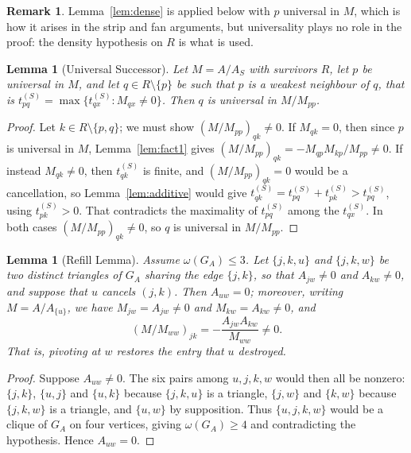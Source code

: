 \documentclass[11pt]{article}
\theoremstyle{plain}
\newtheorem{lemma}[theorem]{Lemma}
\theoremstyle{definition}
\newtheorem{remark}[theorem]{Remark}
\begin{document}
\begin{aiblock}
\begin{remark}\label{rem:dense-universal}
Lemma~\ref{lem:dense} is applied below with $p$ universal in $M$, which is how it arises in the strip
and fan arguments, but universality plays no role in the proof: the density hypothesis on $R$ is
what is used.
\end{remark}

\begin{lemma}[Universal Successor]\label{lem:univsucc}
Let $M=A/A_S$ with survivors $R$, let $p$ be universal in $M$, and let $q\in R\setminus\{p\}$ be such
that $p$ is a weakest neighbour of $q$, that is
$t^{(S)}_{pq}=\max\{t^{(S)}_{qx}:M_{qx}\neq0\}$. Then $q$ is universal in $M/M_{pp}$.
\end{lemma}

\begin{proof}
Let $k\in R\setminus\{p,q\}$; we must show $(M/M_{pp})_{qk}\neq0$. If $M_{qk}=0$, then since $p$ is
universal in $M$, Lemma~\ref{lem:fact1} gives $(M/M_{pp})_{qk}=-M_{qp}M_{kp}/M_{pp}\neq0$. If instead
$M_{qk}\neq0$, then $t^{(S)}_{qk}$ is finite, and $(M/M_{pp})_{qk}=0$ would be a cancellation, so
Lemma~\ref{lem:additive} would give
$t^{(S)}_{qk}=t^{(S)}_{pq}+t^{(S)}_{pk}>t^{(S)}_{pq}$, using $t^{(S)}_{pk}>0$. That contradicts the
maximality of $t^{(S)}_{pq}$ among the $t^{(S)}_{qx}$. In both cases
$(M/M_{pp})_{qk}\neq0$, so $q$ is universal in $M/M_{pp}$.
\end{proof}

\begin{lemma}[Refill Lemma]\label{lem:refill}
Assume $\omega(G_A)\le3$. Let $\{j,k,u\}$ and $\{j,k,w\}$ be two distinct triangles of $G_A$ sharing
the edge $\{j,k\}$, so that $A_{jw}\neq0$ and $A_{kw}\neq0$, and suppose that $u$ cancels $(j,k)$.
Then $A_{uw}=0$; moreover, writing $M=A/A_{\{u\}}$, we have $M_{jw}=A_{jw}\neq0$ and
$M_{kw}=A_{kw}\neq0$, and
\[(M/M_{ww})_{jk}=-\frac{A_{jw}A_{kw}}{M_{ww}}\neq0.\]
That is, pivoting at $w$ restores the entry that $u$ destroyed.
\end{lemma}

\begin{proof}
Suppose $A_{uw}\neq0$. The six pairs among $u,j,k,w$ would then all be nonzero: $\{j,k\}$, $\{u,j\}$
and $\{u,k\}$ because $\{j,k,u\}$ is a triangle, $\{j,w\}$ and $\{k,w\}$ because $\{j,k,w\}$ is a
triangle, and $\{u,w\}$ by supposition. Thus $\{u,j,k,w\}$ would be a clique of $G_A$ on four
vertices, giving $\omega(G_A)\ge4$ and contradicting the hypothesis. Hence $A_{uw}=0$.


\end{proof}
\end{aiblock}
\end{document}
